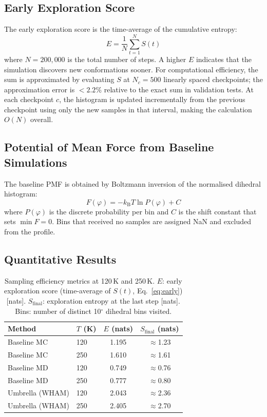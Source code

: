\documentclass[12pt,a4paper]{article}
\begin{document}
\subsection{Early Exploration Score}
The early exploration score is the time-average of the cumulative entropy:
\begin{equation}
  E = \frac{1}{N}\sum_{t=1}^{N} S(t)
  \label{eq:early}
\end{equation}
where $N = 200{,}000$ is the total number of steps.  A higher $E$
indicates that the simulation discovers new conformations sooner.  For
computational efficiency, the sum is approximated by evaluating $S$ at
$N_c = 500$ linearly spaced checkpoints; the approximation error is $<2.2\%$
relative to the exact sum in validation tests.  At each checkpoint $c$,
the histogram is updated incrementally from the previous checkpoint using
only the new samples in that interval, making the calculation $O(N)$
overall.

\subsection{Potential of Mean Force from Baseline Simulations}
The baseline PMF is obtained by Boltzmann inversion of the normalised
dihedral histogram:
\begin{equation}
  F(\varphi) = -k_{\mathrm{B}}T \ln P(\varphi) + C
  \label{eq:pmf_bl}
\end{equation}
where $P(\varphi)$ is the discrete probability per bin and $C$ is the
shift constant that sets $\min F = 0$.  Bins that received no samples
are assigned NaN and excluded from the profile.

\subsection{Quantitative Results}

\begin{table}[H]
\centering
\caption{Sampling efficiency metrics at 120\,K and 250\,K.
  $E$: early exploration score (time-average of $S(t)$, Eq.~\eqref{eq:early}) [nats].
  $S_{\mathrm{final}}$: exploration entropy at the last step [nats].
  Bins: number of distinct 10$^{\circ}$ dihedral bins visited.}
\label{tab:efficiency}
\begin{tabular}{llcc}
\toprule
Method & $T$ (K) & $E$ (nats) & $S_{\mathrm{final}}$ (nats) \\
\midrule
Baseline MC     & 120 & 1.195 & $\approx$1.23 \\
Baseline MC     & 250 & 1.610 & $\approx$1.61 \\
Baseline MD     & 120 & 0.749 & $\approx$0.76  \\
Baseline MD     & 250 & 0.777 & $\approx$0.80 \\
Umbrella (WHAM) & 120 & 2.043 & $\approx$2.36 \\
Umbrella (WHAM) & 250 & 2.405 & $\approx$2.70 \\
\bottomrule
\end{tabular}
\end{table}
\end{document}
